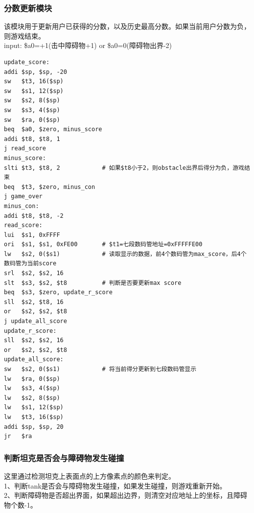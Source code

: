 \subsubsection{分数更新模块}
该模块用于更新用户已获得的分数，以及历史最高分数。如果当前用户分数为负，则游戏结束。\\
input: \$a0=+1(击中障碍物+1) or \$a0=0(障碍物出界-2)\\

\begin{lstlisting}[frame=shadowbox]
update_score:
addi $sp, $sp, -20
sw   $t3, 16($sp)
sw   $s1, 12($sp)
sw   $s2, 8($sp)
sw   $s3, 4($sp)
sw   $ra, 0($sp)
beq  $a0, $zero, minus_score
addi $t8, $t8, 1 
j read_score
minus_score:
slti $t3, $t8, 2            # 如果$t8小于2，则obstacle出界后得分为负，游戏结束
beq  $t3, $zero, minus_con
j game_over
minus_con:
addi $t8, $t8, -2
read_score:
lui  $s1, 0xFFFF
ori  $s1, $s1, 0xFE00       # $t1=七段数码管地址=0xFFFFFE00
lw   $s2, 0($s1)            # 读取显示的数据，前4个数码管为max_score，后4个数码管为当前score
srl  $s2, $s2, 16 
slt  $s3, $s2, $t8          # 判断是否要更新max score
beq  $s3, $zero, update_r_score
sll  $s2, $t8, 16
or   $s2, $s2, $t8
j update_all_score
update_r_score:
sll  $s2, $s2, 16
or   $s2, $s2, $t8
update_all_score:
sw   $s2, 0($s1)            # 将当前得分更新到七段数码管显示
lw   $ra, 0($sp)
lw   $s3, 4($sp)
lw   $s2, 8($sp)
lw   $s1, 12($sp)
lw   $t3, 16($sp)
addi $sp, $sp, 20
jr   $ra
\end{lstlisting}

\subsubsection{判断坦克是否会与障碍物发生碰撞}
这里通过检测坦克上表面点的上方像素点的颜色来判定。\\
1、判断tank是否会与障碍物发生碰撞，如果发生碰撞，则游戏重新开始。\\
2、判断障碍物是否超出界面，如果超出边界，则清空对应地址上的坐标，且障碍物个数-1。\\

